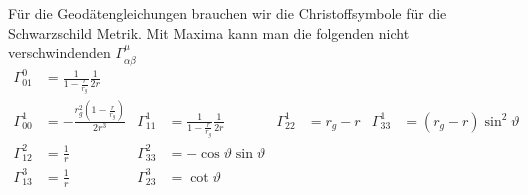 %
Für die Geodätengleichungen brauchen wir die Christoffsymbole 
für die Schwarzschild Metrik.
Mit Maxima kann man die folgenden nicht verschwindenden
$\Gamma^\mu_{\alpha\beta}$ 
\begin{align*}
\Gamma^0_{01}
&=
\frac{1}{1-\frac{r}{r_g}}
\frac{1}{2r}
\\
\Gamma^1_{00}
&=
-\frac{
r_g^2(1-\frac{r}{r_g})
}{2r^3}
&
\Gamma^1_{11}
&=
\frac1{1-\frac{r}{r_g}}\frac{1}{2r}
&
\Gamma^1_{22}
&=
r_g-r
&
\Gamma^1_{33}
&=
(r_g-r)\sin^2\vartheta
\\
\Gamma^2_{12}
&=
\frac1r
&
\Gamma^2_{33}
&=
-\cos\vartheta \sin\vartheta
\\
\Gamma^3_{13}
&=
\frac1r
&
\Gamma^3_{23}
&=
\cot\vartheta
\end{align*}
